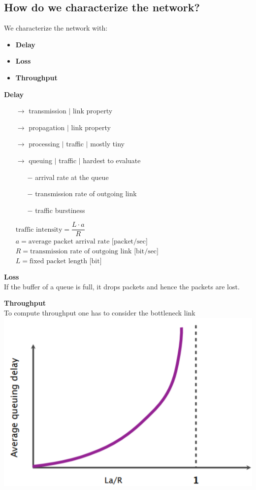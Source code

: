 \documentclass[a4paper, fontsize=8pt, landscape, DIV=1]{scrartcl}
\begin{document}
\begin{multicols*}{4}
				\subsection{How do we characterize the network?}
				We characterize the network with:
				\begin{itemize}[noitemsep]
					\item \textbf{Delay}	
					\item \textbf{Loss}
					\item \textbf{Throughput} 
				\end{itemize}
				\textbf{Delay}
				\vspace{-0.2cm}
				\begin{itemize}[noitemsep]
					\item[$\rightarrow$] transmission $\vert$ link property
					\item[$\rightarrow$] propagation $\vert$ link property
					\item[$\rightarrow$] processing $\vert$ traffic $\vert$ mostly tiny
					\item[$\rightarrow$] queuing $\vert$ traffic $\vert$ hardest to evaluate
					\begin{itemize}
						\item[$-$] arrival rate at the queue
						\item[$-$] transmission rate of outgoing link
						\item[$-$] traffic burstiness 
					\end{itemize}
					$\text{traffic intensity} = \dfrac{L\cdot a}{R}$\\
					$a = \text{average packet arrival rate [packet/sec]} $\\
					$R = \text{transmission rate of outgoing link [bit/sec]} $\\
					$L = \text{fixed packet length [bit]} $	
				\end{itemize}
			\textbf{Loss}\\
			If the buffer of a queue is full, it drops packets and hence the packets are lost.\par
			\textbf{Throughput}\\
			To compute throughput one has to consider the bottleneck link
			\includegraphics[width=\columnwidth]{images/Overview/traffic_intensity.png}

\end{multicols*}
\end{document}
